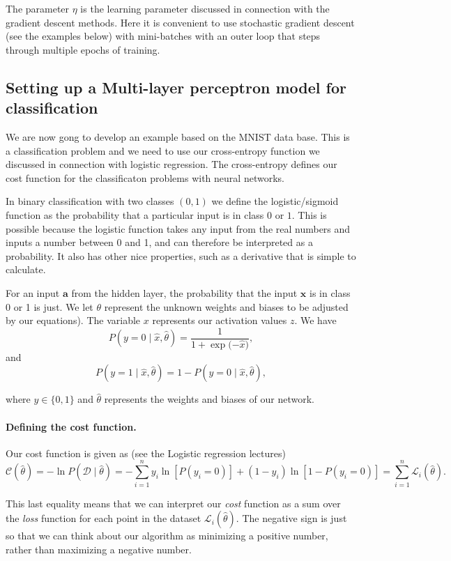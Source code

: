 \documentclass[%
oneside,                 %
final,                   %
10pt]{article}
\begin{document}
The parameter $\eta$ is the learning parameter discussed in connection with the gradient descent methods.
Here it is convenient to use stochastic gradient descent (see the examples below) with mini-batches with an outer loop that steps through multiple epochs of training.



\subsection{Setting up a Multi-layer perceptron model for classification}

We are now gong to develop an example based on the MNIST data
base. This is a classification problem and we need to use our
cross-entropy function we discussed in connection with logistic
regression. The cross-entropy defines our cost function for the
classificaton problems with neural networks.

In binary classification with two classes $(0, 1)$ we define the
logistic/sigmoid function as the probability that a particular input
is in class $0$ or $1$.  This is possible because the logistic
function takes any input from the real numbers and inputs a number
between 0 and 1, and can therefore be interpreted as a probability. It
also has other nice properties, such as a derivative that is simple to
calculate.

For an input $\boldsymbol{a}$ from the hidden layer, the probability that the input $\boldsymbol{x}$
is in class 0 or 1 is just. We let $\theta$ represent the unknown weights and biases to be adjusted by our equations). The variable $x$
represents our activation values $z$. We have
\[
P(y = 0 \mid \hat{x}, \hat{\theta}) = \frac{1}{1 + \exp{(- \hat{x}})} ,
\]
and
\[
P(y = 1 \mid \hat{x}, \hat{\theta}) = 1 - P(y = 0 \mid \hat{x}, \hat{\theta}) ,
\]

where $y \in \{0, 1\}$  and $\hat{\theta}$ represents the weights and biases
of our network.


\paragraph{Defining the cost function.}
Our cost function is given as (see the Logistic regression lectures)
\[
\mathcal{C}(\hat{\theta}) = - \ln P(\mathcal{D} \mid \hat{\theta}) = - \sum_{i=1}^n
y_i \ln[P(y_i = 0)] + (1 - y_i) \ln [1 - P(y_i = 0)] = \sum_{i=1}^n \mathcal{L}_i(\hat{\theta}) .
\]

This last equality means that we can interpret our \emph{cost} function as a sum over the \emph{loss} function
for each point in the dataset $\mathcal{L}_i(\hat{\theta})$.  
The negative sign is just so that we can think about our algorithm as minimizing a positive number, rather
than maximizing a negative number.  
\end{document}
